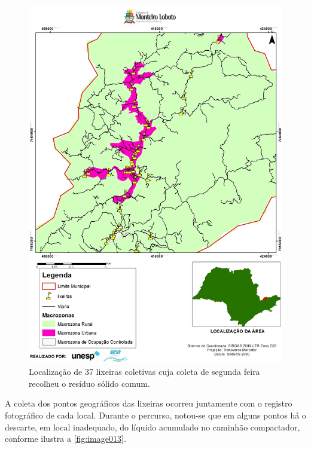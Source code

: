 	\begin{figure}
		\centering
		\includegraphics[width=1\linewidth]{produtos/prodtres/image012}
		\caption{Localização de 37 lixeiras coletivas cuja coleta de segunda feira recolheu o resíduo sólido comum.}
		\label{fig:image012}
	\end{figure}
	
	A coleta dos pontos geográficos das lixeiras ocorreu juntamente com o registro fotográfico de cada local.  Durante o percurso, notou-se que em alguns pontos há o descarte, em local inadequado, do líquido acumulado no caminhão compactador, conforme ilustra a \autoref{fig:image013}.
	
